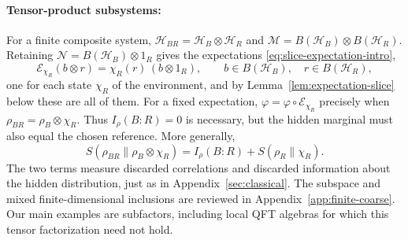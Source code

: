 \documentclass[a4paper,11pt]{article}
\theoremstyle{definition}
\newcommand{\mR}{\mathcal{R}}
\newcommand{\mN}{\mathcal{N}}
\newcommand{\mH}{\mathcal{H}}
\newcommand{\mM}{\mathcal{M}}
\newcommand{\mE}{\mathcal{E}}
\begin{document}
\paragraph{Tensor-product subsystems:}
For a finite composite system, $\mathcal H_{BR}=\mH_B\otimes\mH_R$ and
$\mM=B(\mathcal H_B)\otimes B(\mathcal H_R)$. Retaining $\mN=B(\mathcal H_B)\otimes1_R$ gives the expectations \eqref{eq:slice-expectation-intro},
\begin{equation}\label{condexp}
 \mE_{\chi_R}(b\otimes r)=\chi_R(r)\,(b\otimes1_R),
 \qquad b\in B(\mathcal H_B),\quad r\in B(\mathcal H_R),
\end{equation}
one for each state $\chi_R$ of the environment, and by Lemma~\ref{lem:expectation-slice} below these are all of them.
For a fixed expectation, $\varphi=\varphi\circ\mE_{\chi_R}$ precisely when
$\rho_{BR}=\rho_B\otimes\chi_R$. Thus $I_\rho(B:R)=0$ is necessary, but the hidden
marginal must also equal the chosen reference. More generally,
\begin{equation}\label{eq:quantum-coarse-entropy-decomposition}
 S(\rho_{BR}\|\rho_B\otimes\chi_R)
 =I_\rho(B:R)+S(\rho_R\|\chi_R).
\end{equation}
The two terms measure discarded correlations and discarded information about the
hidden distribution, just as in Appendix~\ref{sec:classical}.
The subspace and mixed finite-dimensional inclusions are reviewed in
Appendix~\ref{app:finite-coarse}. Our main examples are subfactors, including
local QFT algebras for which this tensor factorization need not hold.
\end{document}
